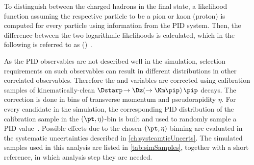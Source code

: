 To distinguish between the charged hadrons in the final state, a likelihood function assuming the respective particle to be a pion or kaon (proton) is computed for every particle using information from the PID system.
Then, the difference between the two logarithmic likelihoods is calculated, which in the following is referred to as \dllkpi (\dllppi)~\cite{Aaij:2014jba}.

As the PID observables are not described well in the simulation, selection requirements on such observables can result in different distributions in other correlated observables.
Therefore the \dllkpi and \dllppi variables are corrected using calibration samples of kinematically-clean $\Dstarp\!\to\Dz\!\left(\to\Km\pip\right)\pip$ decays.
The correction is done in bins of transverse momentum \pt and pseudorapidity $\eta$.
For every candidate in the simulation, the corresponding PID distribution of the calibration sample in the $(\pt,\eta)$-bin is built and used to randomly sample a PID value~\cite{Anderlini:2202412}.
Possible effects due to the chosen $(\pt,\eta)$-binning are evaluated in the systematic uncertainties described in \cref{ch:systeamticUncerts}.
The simulated samples used in this analysis are listed in \cref{tab:simSamples}, together with a short reference, in which analysis step they are needed.
